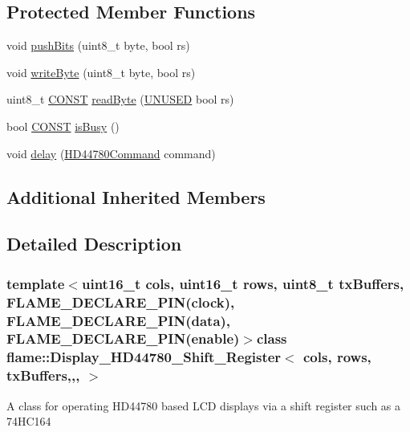 \subsection*{Protected Member Functions}
\begin{DoxyCompactItemize}
\item 
void \hyperlink{classflame_1_1_display___h_d44780___shift___register_adcff45c7df2cd357da826d236396f2ca}{push\-Bits} (uint8\-\_\-t byte, bool rs)
\item 
void \hyperlink{classflame_1_1_display___h_d44780___shift___register_a95cc0c60b735e08990c4668e361e5e8b}{write\-Byte} (uint8\-\_\-t byte, bool rs)
\item 
uint8\-\_\-t \hyperlink{io_8h_a0c33b494a68ce28497e7ce8e5e95feff}{C\-O\-N\-S\-T} \hyperlink{classflame_1_1_display___h_d44780___shift___register_a1eda0c5acf844c39aab8abb85f371000}{read\-Byte} (\hyperlink{io_8h_addf5ec070e9499d36b7f2009ce736076}{U\-N\-U\-S\-E\-D} bool rs)
\item 
bool \hyperlink{io_8h_a0c33b494a68ce28497e7ce8e5e95feff}{C\-O\-N\-S\-T} \hyperlink{classflame_1_1_display___h_d44780___shift___register_af798f14b87bdafbcedf7b4458df2621b}{is\-Busy} ()
\item 
void \hyperlink{classflame_1_1_display___h_d44780___shift___register_abf59a4215c52f6cd29bdb2e901346945}{delay} (\hyperlink{namespaceflame_ad814bac19b0569ff480de071076a23e9}{H\-D44780\-Command} command)
\end{DoxyCompactItemize}
\subsection*{Additional Inherited Members}


\subsection{Detailed Description}
\subsubsection*{template$<$uint16\-\_\-t cols, uint16\-\_\-t rows, uint8\-\_\-t tx\-Buffers, F\-L\-A\-M\-E\-\_\-\-D\-E\-C\-L\-A\-R\-E\-\_\-\-P\-I\-N(clock), F\-L\-A\-M\-E\-\_\-\-D\-E\-C\-L\-A\-R\-E\-\_\-\-P\-I\-N(data), F\-L\-A\-M\-E\-\_\-\-D\-E\-C\-L\-A\-R\-E\-\_\-\-P\-I\-N(enable)$>$class flame\-::\-Display\-\_\-\-H\-D44780\-\_\-\-Shift\-\_\-\-Register$<$ cols, rows, tx\-Buffers,,, $>$}

A class for operating H\-D44780 based L\-C\-D displays via a shift register such as a 74\-H\-C164


